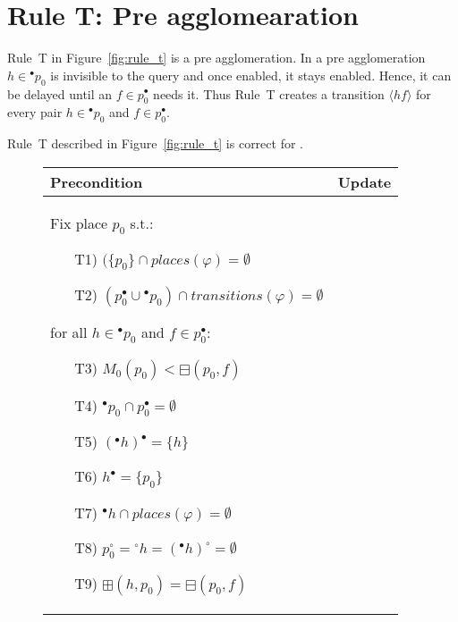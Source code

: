 \section*{Rule T: Pre agglomearation}\label{sec:rule_t}

Rule~T in Figure~\ref{fig:rule_t} is a pre agglomeration.
In a pre agglomeration $h\in{}^\bullet p_0$ is invisible to the query and once enabled, it stays enabled.
Hence, it can be delayed until an $f\in p_0^\bullet$ needs it.
Thus Rule~T creates a transition $\langle h f\rangle$ for every pair $h\in{}^\bullet p_0$ and $f\in p_0^\bullet$.

\begin{theorem}
    Rule~T described in Figure~\ref{fig:rule_t} is correct for \LTLX.
\end{theorem}

\begin{figure}[h!]
    \centering
    \begin{adjustbox}{center}
        \begin{tabular}{|p{75mm}|p{75mm}|} \hline
        Precondition & Update \\ \hline
        Fix place $p_0$ s.t.:
        \begin{itemize}[leftmargin=10mm]
            \item[T1)] $(\{p_0\} \cap places(\varphi) = \emptyset$
            \item[T2)] $(p_0^\bullet \cup {}^\bullet p_0) \cap transitions(\varphi) = \emptyset$
        \end{itemize}
        \noindent for all $h\in{}^\bullet p_0$ and $f \in p_0^\bullet$:
        \begin{itemize}[leftmargin=10mm]
            \item[T3)] $M_0(p_0) < \boxminus(p_0,f)$
            \item[T4)] $^\bullet p_0 \cap p_0^\bullet = \emptyset$
            \item[T5)] $({}^\bullet h)^\bullet = \{h\}$
            \item[T6)] $h^\bullet=\{p_0\}$
            \item[T7)] ${}^\bullet h \cap places(\varphi) = \emptyset$
            \item[T8)] $p_0^\circ = {}^\circ h = ({}^\bullet h)^\circ = \emptyset$
            \item[T9)] $\boxplus(h, p_0) = \boxminus(p_0,f)$
        \end{itemize}



\end{tabular}
\end{adjustbox}
\end{figure}
